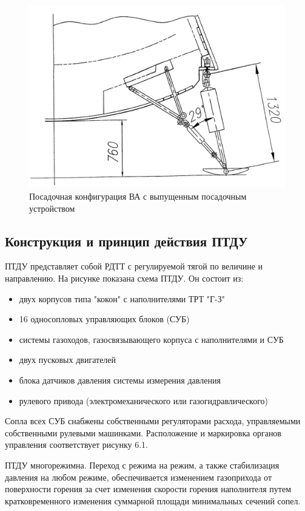 \begin{figure}[h]
	\centering
	\includegraphics[scale=0.9]{images/posad_config.jpg}
	\caption{Посадочная конфигурация ВА с выпущенным посадочным устройством}
	\label{fig:posad_config}
\end{figure}
\clearpage

\subsection{Конструкция и принцип действия ПТДУ}
ПТДУ представляет собой РДТТ с регулируемой тягой по величине и направлению. На рисунке показана схема ПТДУ. Он состоит из:
\begin{itemize}
	\item двух корпусов типа "кокон"  с наполнителями ТРТ "Г-З"
	\item 16 односопловых управляющих блоков (СУБ)
	\item системы газоходов, газосвязывающего корпуса с наполнителями и СУБ
	\item двух пусковых двигателей 
	\item блока датчиков давления системы измерения давления
	\item рулевого привода (электромеханического или газогидравлического) 
\end{itemize}

Сопла всех СУБ снабжены собственными регуляторами расхода, управляемыми собственными рулевыми машинками. Расположение и маркировка органов управления соответствует рисунку 6.1.

ПТДУ многорежимна. Переход с режима на режим, а также стабилизация давления на любом режиме, обеспечивается изменением газоприхода от поверхности горения за счет изменения скорости горения наполнителя путем кратковременного изменения суммарной площади минимальных сечений сопел.

